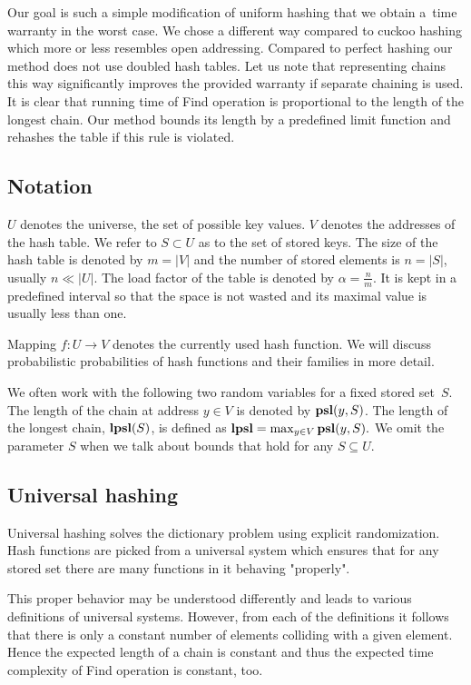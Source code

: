 Our goal is such a simple modification of uniform hashing that we obtain a~time warranty in the worst case. We chose a different way compared to cuckoo hashing which more or less resembles open addressing. Compared to perfect hashing our method does not use doubled hash tables. Let us note that representing chains this way significantly improves the provided warranty if separate chaining is used.
It is clear that running time of Find operation is proportional to the length of the longest chain. Our method bounds its length by a predefined limit function and rehashes the table if this rule is violated.

\subsection{Notation}
$U$ denotes the universe, the set of possible key values. $V$ denotes the addresses of the hash table. We refer to $S \subset U$ as to the set of stored keys. The size of the hash table is denoted by $m = |V|$ and the number of stored elements is $n = |S|$, usually $n \ll |U|$. The load factor of the table is denoted by $\alpha = \frac{n}{m}$. It is kept in a predefined interval so that the space is not wasted and its maximal value is usually less than one.

Mapping $f\colon U \rightarrow V$ denotes the currently used hash function. We will discuss probabilistic probabilities of hash functions and their families in more detail.

We often work with the following two random variables for a fixed stored set~$S$. The length of the chain at address $y \in V$ is denoted by $\mathbf{psl}(y, S)$. The length of the longest chain, $\mathbf{lpsl}(S)$, is defined as $\mathbf{lpsl} = \max_{y \in V} \mathbf{psl}(y, S).$ We omit the parameter $S$ when we talk about bounds that hold for any $S \subseteq U$.

\subsection{Universal hashing}
Universal hashing solves the dictionary problem using explicit randomization. Hash functions are picked from a universal system which ensures that for any stored set there are many functions in it behaving "properly".

This proper behavior may be understood differently and leads to various definitions of universal systems. However, from each of the definitions it follows that there is only a constant number of elements colliding with a given element. Hence the expected length of a chain is constant and thus the expected time complexity of Find operation is constant, too.

